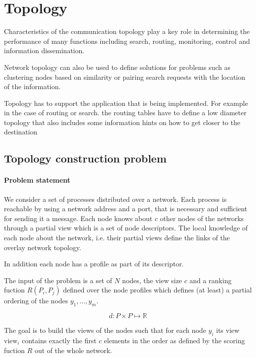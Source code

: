 \section{Topology}
Characteristics of the communication topology play a key role in determining the performance of many functions including search, routing, monitoring, control and information dissemination.

Network topology can also be used to define solutions for problems such as clustering nodes based on similarity or pairing search requests with the location of the information.

Topology has to support the application that is being implemented. For example in the case of routing or search. the routing tables have to define a low diameter topology that also includes some information hints on how to get closer to the destination



\subsection{Topology construction problem}

\paragraph{Problem statement} We consider a set of processes distributed over a network. Each process is reachable by using a network address and a port, that is necessary and sufficient for sending it a message. Each node knows about $c$ other nodes of the networks through a partial view which is a set of node descriptors. The local knowledge of each node about the network, i.e. their partial views define the links of the overlay network topology.

In addition each node has a profile as part of its descriptor.

The input of the problem is a set of $N$ nodes, the view size $c$ and a ranking fuction $R(P_i, P_j)$ defined over the node profiles which defines (at least) a partial ordering of the nodes $y_1, \ldots, y_m$.

\begin{equation}
 d: P \times P \mapsto \mathbb{R}
\end{equation}

The goal is to build the views of the nodes such that for each node $y_i$ its view $\mbox{view}_i$ contains exactly the first $c$ elements in the order as defined by the scoring fuction $R$ out of the whole network.

